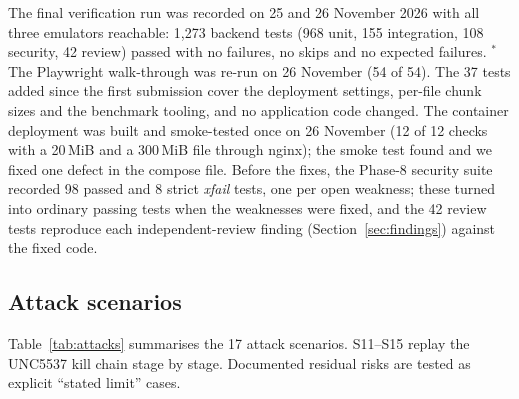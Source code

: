 \documentclass[conference]{IEEEtran}
\begin{document}
The final verification run was recorded on 25 and 26 November 2026 with all three emulators reachable: 1,273 backend tests (968 unit, 155 integration, 108 security, 42 review) passed with no failures, no skips and no expected failures. $^{*}$The Playwright walk-through was re-run on 26 November (54 of 54). The 37 tests added since the first submission cover the deployment settings, per-file chunk sizes and the benchmark tooling, and no application code changed. The container deployment was built and smoke-tested once on 26 November (12 of 12 checks with a 20\,MiB and a 300\,MiB file through nginx); the smoke test found and we fixed one defect in the compose file. Before the fixes, the Phase-8 security suite recorded 98 passed and 8 strict \emph{xfail} tests, one per open weakness; these turned into ordinary passing tests when the weaknesses were fixed, and the 42 review tests reproduce each independent-review finding (Section~\ref{sec:findings}) against the fixed code.

\subsection{Attack scenarios}
Table~\ref{tab:attacks} summarises the 17 attack scenarios. S11--S15 replay the UNC5537 kill chain stage by stage. Documented residual risks are tested as explicit ``stated limit'' cases.
\end{document}
